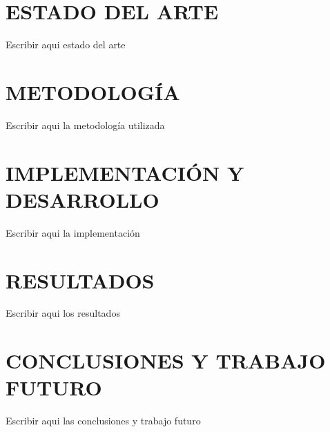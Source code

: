 \documentclass[12pt,a4paper,twoside]{article} %
\begin{document}
\section{ESTADO DEL ARTE}
Escribir aqui estado del arte

\section{METODOLOGÍA}
Escribir aqui la metodología utilizada

\section{IMPLEMENTACIÓN Y DESARROLLO}
Escribir aqui la implementación

\section{RESULTADOS}
Escribir aqui los resultados

\section{CONCLUSIONES Y TRABAJO FUTURO}
Escribir aqui las conclusiones y trabajo futuro

\thispagestyle{empty}
\pagestyle{empty}

%
\end{document}
